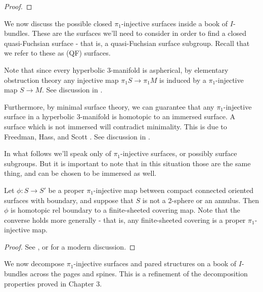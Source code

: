 \begin{proof}


\end{proof}

We now discuss the possible closed $\pi_1$-injective surfaces inside a book of
$I$-bundles. These are the surfaces we'll need to consider in order to find
a closed quasi-Fuchsian surface - that is, a quasi-Fuchsian surface subgroup.
Recall that we refer to these as (QF) surfaces.

Note that since every hyperbolic 3-manifold is aspherical, by elementary
obstruction theory any injective map $\pi_1S \to \pi_1M$ is induced by
a $\pi_1$-injective map $S \to M$. See discussion in \cite[Section 1.1]{LR}.

Furthermore, by minimal surface theory, we can guarantee that any
$\pi_1$-injective surface in a hyperbolic 3-manifold is homotopic to an
immersed surface.  A surface which is not immersed will contradict minimality.
This is due to Freedman, Hass, and Scott \cite{FreedmanHassScott}. See
discussion in \cite[Section 1]{Neu}.

In what follows we'll speak only of $\pi_1$-injective surfaces, or possibly
surface subgroups. But it is important to note that in this situation those are
the same thing, and can be chosen to be immersed as well.

\begin{lemma}\label{L:covering}

Let $\phi\colon S \to S'$ be a proper $\pi_1$-injective map between compact
connected oriented surfaces with boundary, and suppose that $S$ is not
a 2-sphere or an annulus.  Then $\phi$ is homotopic rel boundary to
a finite-sheeted covering map.  Note that the converse holds more generally
- that is, any finite-sheeted covering is a proper $\pi_1$-injective map.

\end{lemma}

\begin{proof}

See \cite{Nielsen}, or \cite{GabaiKazez} for a modern discussion.

\end{proof}

We now decompose $\pi_1$-injective surfaces and pared structures on a book of
$I$-bundles across the pages and spines. This is a refinement of the
decomposition properties proved in Chapter 3.

